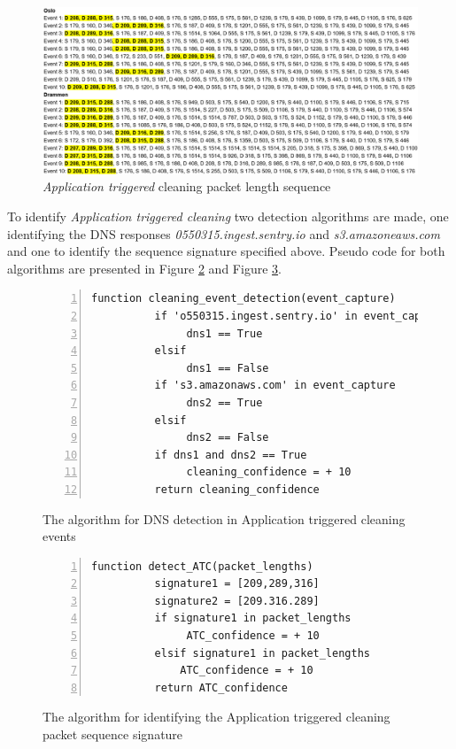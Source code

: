 \begin{figure}[H]
    \centering
    \includegraphics[width=\textwidth]{figures/Sequence_ATC.png}
    \caption{\textit{Application triggered} cleaning packet length sequence}
    \label{fig:ATCseq}
\end{figure}

To identify \textit{Application triggered cleaning} two detection algorithms are made, one identifying the \gls{DNS} responses \textit{0550315.ingest.sentry.io} and \textit{s3.amazoneaws.com} and one to identify the sequence signature specified above. Pseudo code for both algorithms are presented in Figure \ref{fig:pseudocodeATCDNS} and Figure \ref{fig:Sudo_code_ATC}.

\begin{figure}[H]
    \centering
    \begin{lstlisting}[numbers=left]
     function cleaning_event_detection(event_capture)
          if 'o550315.ingest.sentry.io' in event_capture
               dns1 == True
          elsif
               dns1 == False
          if 's3.amazonaws.com' in event_capture
               dns2 == True
          elsif
               dns2 == False
          if dns1 and dns2 == True      
               cleaning_confidence = + 10
          return cleaning_confidence
    \end{lstlisting}
    \caption{The algorithm for \gls{DNS} detection in Application triggered cleaning events}
    \label{fig:pseudocodeATCDNS}
\end{figure}

\begin{figure}[H]
    \centering
    \begin{lstlisting}[numbers=left]
     function detect_ATC(packet_lengths)
          signature1 = [209,289,316]
          signature2 = [209.316.289]
          if signature1 in packet_lengths
               ATC_confidence = + 10
          elsif signature1 in packet_lengths
              ATC_confidence = + 10
          return ATC_confidence
    \end{lstlisting}
    \caption{The algorithm for identifying the Application triggered cleaning packet sequence signature}
    \label{fig:Sudo_code_ATC}
\end{figure}

